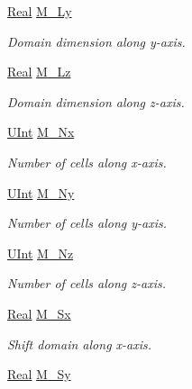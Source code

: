 \begin{DoxyCompactItemize}
\hyperlink{namespaceFVCode3D_a40c1f5588a248569d80aa5f867080e83}{Real} \hyperlink{classFVCode3D_1_1Data_ab1c235ca1a351fc10315c8b28f84549c}{M\+\_\+\+Ly}
\begin{DoxyCompactList}\small\item\em Domain dimension along y-\/axis. \end{DoxyCompactList}\item 
\hyperlink{namespaceFVCode3D_a40c1f5588a248569d80aa5f867080e83}{Real} \hyperlink{classFVCode3D_1_1Data_aec68be07c237ed1170bdbb876b01ec95}{M\+\_\+\+Lz}
\begin{DoxyCompactList}\small\item\em Domain dimension along z-\/axis. \end{DoxyCompactList}\item 
\hyperlink{namespaceFVCode3D_a4bf7e328c75d0fd504050d040ebe9eda}{U\+Int} \hyperlink{classFVCode3D_1_1Data_ae8b5472d8bc05b2b312380fe0bcfc8f9}{M\+\_\+\+Nx}
\begin{DoxyCompactList}\small\item\em Number of cells along x-\/axis. \end{DoxyCompactList}\item 
\hyperlink{namespaceFVCode3D_a4bf7e328c75d0fd504050d040ebe9eda}{U\+Int} \hyperlink{classFVCode3D_1_1Data_a90a08fe8c4566c7afcdf62772ee4712b}{M\+\_\+\+Ny}
\begin{DoxyCompactList}\small\item\em Number of cells along y-\/axis. \end{DoxyCompactList}\item 
\hyperlink{namespaceFVCode3D_a4bf7e328c75d0fd504050d040ebe9eda}{U\+Int} \hyperlink{classFVCode3D_1_1Data_a7f877632f0740bbedf5ce5e05d6d1add}{M\+\_\+\+Nz}
\begin{DoxyCompactList}\small\item\em Number of cells along z-\/axis. \end{DoxyCompactList}\item 
\hyperlink{namespaceFVCode3D_a40c1f5588a248569d80aa5f867080e83}{Real} \hyperlink{classFVCode3D_1_1Data_aabcbf0097b9af53baa21fe6c2e340aff}{M\+\_\+\+Sx}
\begin{DoxyCompactList}\small\item\em Shift domain along x-\/axis. \end{DoxyCompactList}\item 
\hyperlink{namespaceFVCode3D_a40c1f5588a248569d80aa5f867080e83}{Real} \hyperlink{classFVCode3D_1_1Data_a4020737adfbc21dc3e5b682ac60692da}{M\+\_\+\+Sy}

\end{DoxyCompactItemize}
